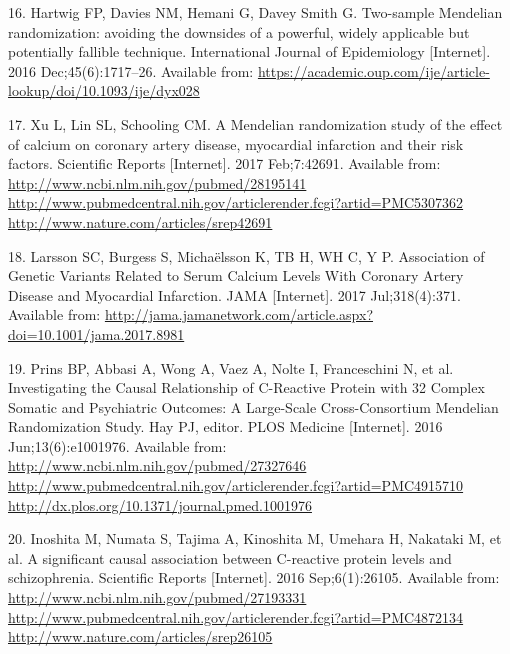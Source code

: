 \documentclass[]{article}
\begin{document}
\hypertarget{ref-Hartwig2016}{}
16. Hartwig FP, Davies NM, Hemani G, Davey Smith G. Two-sample Mendelian
randomization: avoiding the downsides of a powerful, widely applicable
but potentially fallible technique. International Journal of
Epidemiology {[}Internet{]}. 2016 Dec;45(6):1717--26. Available from:
\url{https://academic.oup.com/ije/article-lookup/doi/10.1093/ije/dyx028}

\hypertarget{ref-Xu2017}{}
17. Xu L, Lin SL, Schooling CM. A Mendelian randomization study of the
effect of calcium on coronary artery disease, myocardial infarction and
their risk factors. Scientific Reports {[}Internet{]}. 2017 Feb;7:42691.
Available from:
\href{http://www.ncbi.nlm.nih.gov/pubmed/28195141\%20http://www.pubmedcentral.nih.gov/articlerender.fcgi?artid=PMC5307362\%20http://www.nature.com/articles/srep42691}{http://www.ncbi.nlm.nih.gov/pubmed/28195141 http://www.pubmedcentral.nih.gov/articlerender.fcgi?artid=PMC5307362 http://www.nature.com/articles/srep42691}

\hypertarget{ref-Larsson2017}{}
18. Larsson SC, Burgess S, Michaëlsson K, TB H, WH C, Y P. Association
of Genetic Variants Related to Serum Calcium Levels With Coronary Artery
Disease and Myocardial Infarction. JAMA {[}Internet{]}. 2017
Jul;318(4):371. Available from:
\url{http://jama.jamanetwork.com/article.aspx?doi=10.1001/jama.2017.8981}

\hypertarget{ref-Prins2016}{}
19. Prins BP, Abbasi A, Wong A, Vaez A, Nolte I, Franceschini N, et al.
Investigating the Causal Relationship of C-Reactive Protein with 32
Complex Somatic and Psychiatric Outcomes: A Large-Scale Cross-Consortium
Mendelian Randomization Study. Hay PJ, editor. PLOS Medicine
{[}Internet{]}. 2016 Jun;13(6):e1001976. Available from:
\href{http://www.ncbi.nlm.nih.gov/pubmed/27327646\%20http://www.pubmedcentral.nih.gov/articlerender.fcgi?artid=PMC4915710\%20http://dx.plos.org/10.1371/journal.pmed.1001976}{http://www.ncbi.nlm.nih.gov/pubmed/27327646 http://www.pubmedcentral.nih.gov/articlerender.fcgi?artid=PMC4915710 http://dx.plos.org/10.1371/journal.pmed.1001976}

\hypertarget{ref-Inoshita2016}{}
20. Inoshita M, Numata S, Tajima A, Kinoshita M, Umehara H, Nakataki M,
et al. A significant causal association between C-reactive protein
levels and schizophrenia. Scientific Reports {[}Internet{]}. 2016
Sep;6(1):26105. Available from:
\href{http://www.ncbi.nlm.nih.gov/pubmed/27193331\%20http://www.pubmedcentral.nih.gov/articlerender.fcgi?artid=PMC4872134\%20http://www.nature.com/articles/srep26105}{http://www.ncbi.nlm.nih.gov/pubmed/27193331 http://www.pubmedcentral.nih.gov/articlerender.fcgi?artid=PMC4872134 http://www.nature.com/articles/srep26105}
\end{document}
